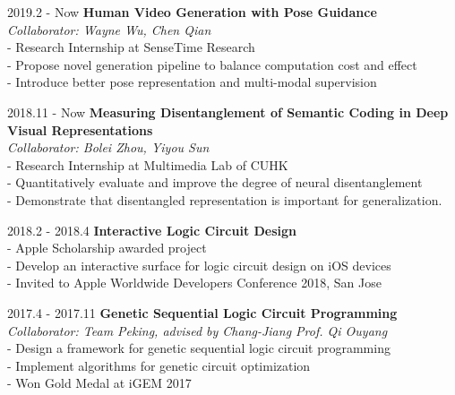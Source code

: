 \documentclass{academiccv}
\begin{document}
\begin{tablist}

\item[2019.2 - Now] 	\tab \textbf {Human Video Generation with Pose Guidance} \textbf
					\\ \tab \emph{Collaborator: Wayne Wu, Chen Qian}\emph
				    \\ \tab - Research Internship at SenseTime Research
				     \\ \tab - Propose novel generation pipeline to balance computation cost and effect
				     \\ \tab - Introduce better pose representation and multi-modal supervision	

\item[2018.11 - Now] 	\tab \textbf {Measuring Disentanglement of Semantic Coding in Deep Visual Representations} \textbf
					\\ \tab \emph{Collaborator: Bolei Zhou, Yiyou Sun}\emph
					\\ \tab - Research Internship at Multimedia Lab of CUHK
				      \\ \tab - Quantitatively evaluate and improve the degree of neural disentanglement
				      \\ \tab - Demonstrate that disentangled representation is important for generalization.
				   			     
				     
\item[2018.2 - 2018.4] 	\tab \textbf {Interactive Logic Circuit Design} \textbf
					\\ \tab - Apple Scholarship awarded project
				    \\ \tab - Develop an interactive surface for logic circuit design on iOS devices
				    \\ \tab - Invited to Apple Worldwide Developers Conference 2018, San Jose

\item[2017.4 - 2017.11] 	\tab \textbf {Genetic Sequential Logic Circuit Programming} \textbf
					\\ \tab \emph{Collaborator: Team Peking, advised by Chang-Jiang Prof. Qi Ouyang}\emph
					\\ \tab - Design a framework for genetic sequential logic circuit programming
				    \\ \tab - Implement algorithms for genetic circuit optimization
				    \\ \tab - Won Gold Medal at iGEM 2017		    
				     				     			     				      
\end{tablist}
\end{document}
